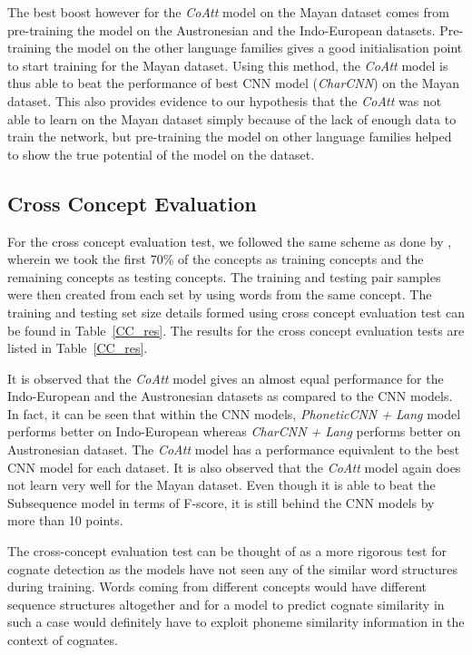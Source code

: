 \documentclass[11pt,letterpaper]{article}
\begin{document}
The best boost however for the \textit{CoAtt} model on the Mayan dataset comes from pre-training the model on the Austronesian and the Indo-European datasets. Pre-training the model on the other language families gives a good initialisation point to start training for the Mayan dataset. Using this method, the \textit{CoAtt} model is thus able to beat the performance of best CNN model (\textit{CharCNN}) on the Mayan dataset. This also provides evidence to our hypothesis that the \textit{CoAtt} was not able to learn on the Mayan dataset simply because of the lack of enough data to train the network, but pre-training the model on other language families helped to show the true potential of the model on the dataset.

\subsection{Cross Concept Evaluation}

For the cross concept evaluation test, we followed the same scheme as done by \cite{rama2016siamese}, wherein we took the first 70\% of the concepts as training concepts and the remaining concepts as testing concepts. The training and testing pair samples were then created from each set by using words from the same concept. The training and testing set size details formed using cross concept evaluation test can be found in Table~\ref{CC_res}. The results for the cross concept evaluation tests are listed in Table~\ref{CC_res}.

It is observed that the \textit{CoAtt} model gives an almost equal performance for the Indo-European and the Austronesian datasets as compared to the CNN models. In fact, it can be seen that within the CNN models, \textit{PhoneticCNN + Lang} model performs better on Indo-European whereas \textit{CharCNN + Lang} performs better on Austronesian dataset. The \textit{CoAtt} model has a performance equivalent to the best CNN model for each dataset. It is also observed that the \textit{CoAtt} model again does not learn very well for the Mayan dataset. Even though it is able to beat the Subsequence model in terms of F-score, it is still behind the CNN models by more than 10 points.

The cross-concept evaluation test can be thought of as a more rigorous test for cognate detection as the models have not seen any of the similar word structures during training. Words coming from different concepts would have different sequence structures altogether and for a model to predict cognate similarity in such a case would definitely have to exploit phoneme similarity information in the context of cognates.
\end{document}
